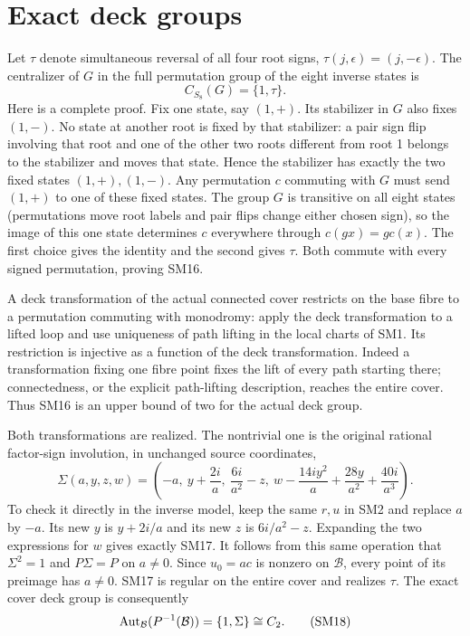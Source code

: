 \documentclass[11pt]{article}
\begin{document}
\section{Exact deck groups}
Let $\tau$ denote simultaneous reversal of all four root signs,
$\tau(j,\epsilon)=(j,-\epsilon)$. The centralizer of $G$ in
the full permutation group of the eight inverse states is
\begin{equation}
 C_{S_8}(G)=\{1,\tau\}.\tag{SM16}
\end{equation}
Here is a complete proof. Fix one state, say $(1,+)$. Its
stabilizer in $G$ also fixes $(1,-)$. No state at another root
is fixed by that stabilizer: a pair sign flip involving that
root and one of the other two roots different from root 1
belongs to the stabilizer and moves that state. Hence the
stabilizer has exactly the two fixed states $(1,+),(1,-)$.
Any permutation $c$ commuting with $G$ must send $(1,+)$ to
one of these fixed states. The group $G$ is transitive on all
eight states (permutations move root labels and pair flips
change either chosen sign), so the image of this one state
determines $c$ everywhere through $c(gx)=g c(x)$. The first
choice gives the identity and the second gives $\tau$.
Both commute with every signed permutation, proving SM16.

A deck transformation of the actual connected cover restricts
on the base fibre to a permutation commuting with monodromy:
apply the deck transformation to a lifted loop and use uniqueness
of path lifting in the local charts of SM1. Its restriction is
injective as a function of the deck transformation. Indeed a
transformation fixing one fibre point fixes the lift of every
path starting there; connectedness, or the explicit path-lifting
description, reaches the entire cover. Thus SM16 is an upper
bound of two for the actual deck group.

Both transformations are realized. The nontrivial one is the
original rational factor-sign involution, in unchanged source
coordinates,
\begin{equation}
 \Sigma(a,y,z,w)=\left(-a,\ y+\frac{2i}{a},\
 \frac{6i}{a^2}-z,\
 w-\frac{14iy^2}{a}+\frac{28y}{a^2}+\frac{40i}{a^3}\right).
 \tag{SM17}
\end{equation}
To check it directly in the inverse model, keep the same $r,u$
in SM2 and replace $a$ by $-a$. Its new $y$ is $y+2i/a$ and
its new $z$ is $6i/a^2-z$. Expanding the two expressions for
$w$ gives exactly SM17. It follows from this same operation
that $\Sigma^2=1$ and $P\Sigma=P$ on $a\ne0$. Since $u_0=ac$
is nonzero on $\mathcal B$, every point of its preimage has
$a\ne0$. SM17 is regular on the entire cover and realizes
$\tau$. The exact cover deck group is consequently
\begin{equation}
 \operatorname{Aut}_{\mathcal B}(P^{-1}(\mathcal B))=\{1,\Sigma\}\cong C_2.
 \tag{SM18}
\end{equation}
\end{document}
